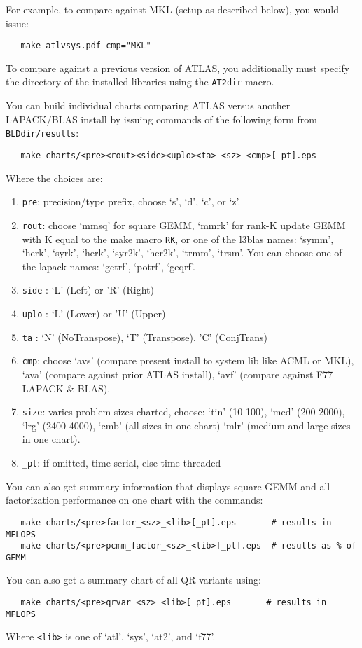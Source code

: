 \documentclass[11pt]{article}
\begin{document}
For example, to compare against MKL (setup as described below), you would issue:
\begin{verbatim}
   make atlvsys.pdf cmp="MKL"
\end{verbatim}

To compare against a previous version of ATLAS, you additionally must specify
the directory of the installed libraries using the \texttt{AT2dir} macro.

You can build individual charts comparing ATLAS versus another LAPACK/BLAS
install by issuing commands of the following form from {\tt BLDdir/results}:
\begin{verbatim}
   make charts/<pre><rout><side><uplo><ta>_<sz>_<cmp>[_pt].eps
\end{verbatim}
Where the choices are:
\begin{enumerate}
\item \verb+pre+: precision/type prefix, choose `s', `d', `c', or `z'.
\item \verb+rout+: choose `mmsq' for square GEMM, `mmrk' for rank-K
      update GEMM with K equal to the make macro \texttt{RK}, or
      one of the l3blas names: `symm', `herk', `syrk', `herk', `syr2k',
      `her2k', `trmm', `trsm'.  You can choose one of the lapack names:
      `getrf', `potrf', `geqrf'.
\item \verb+side+ : `L' (Left) or 'R' (Right)
\item \verb+uplo+ : `L' (Lower) or 'U' (Upper)
\item \verb+ta+ : `N' (NoTranspose), `T' (Transpose), 'C' (ConjTrans)
\item \verb+cmp+: choose `avs' (compare present install to system lib like
      ACML or MKL), `ava' (compare against prior ATLAS install),
      `avf' (compare against F77 LAPACK \& BLAS).
\item \verb+size+: varies problem sizes charted, choose: `tin' (10-100), 
      `med' (200-2000), `lrg' (2400-4000), `cmb' (all sizes in one chart)
       `mlr' (medium and large sizes in one chart).
\item \verb+_pt+: if omitted, time serial, else time threaded
\end{enumerate}

You can also get summary information that displays square GEMM and all
factorization performance on one chart with the commands:
\begin{verbatim}
   make charts/<pre>factor_<sz>_<lib>[_pt].eps       # results in MFLOPS
   make charts/<pre>pcmm_factor_<sz>_<lib>[_pt].eps  # results as % of GEMM
\end{verbatim}
You can also get a summary chart of all QR variants using:
\begin{verbatim}
   make charts/<pre>qrvar_<sz>_<lib>[_pt].eps       # results in MFLOPS
\end{verbatim}
Where \verb+<lib>+ is one of `atl', `sys', `at2', and `f77'.
\end{document}
